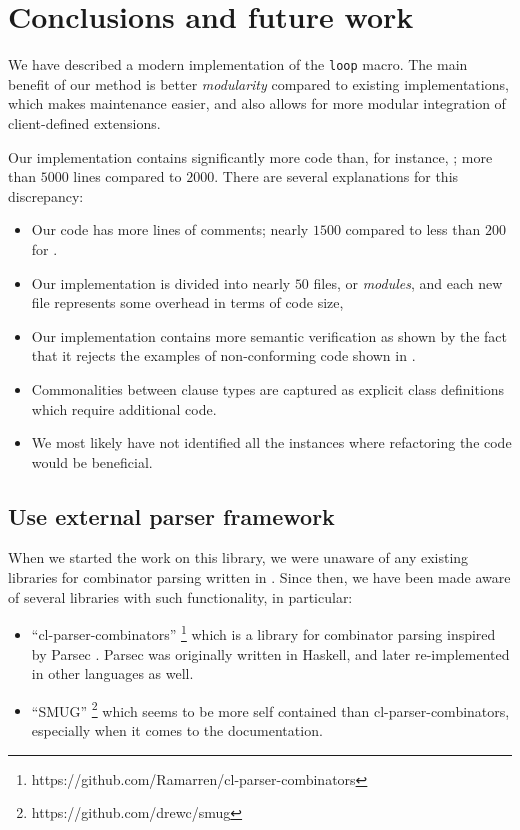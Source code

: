 \section{Conclusions and future work}

We have described a modern implementation of the \commonlisp{}
\texttt{loop} macro.  The main benefit of our method is better
\emph{modularity} compared to existing implementations, which makes
maintenance easier, and also allows for more modular integration of
client-defined extensions.

Our implementation contains significantly more code than, for
instance, \mitloop{}; more than $5000$ lines compared to $2000$.  There
are several explanations for this discrepancy:

\begin{itemize}
\item Our code has more lines of comments; nearly $1500$ compared to
  less than $200$ for \mitloop{}.
\item Our implementation is divided into nearly $50$ files, or
  \emph{modules}, and each new file represents some overhead in terms
  of code size,
\item Our implementation contains more semantic verification as shown
  by the fact that it rejects the examples of non-conforming code shown
  in .
\item Commonalities between clause types are captured as explicit
  class definitions which require additional code.
\item We most likely have not identified all the instances where
  refactoring the code would be beneficial.
\end{itemize}

\subsection{Use external parser framework}
\label{sec-using-external-parser-framework}

When we started the work on this library, we were unaware of any
existing libraries for combinator parsing written in \commonlisp{}.
Since then, we have been made aware of several libraries with such
functionality, in particular:

\begin{itemize}
\item ``cl-parser-combinators''%
\footnote{https://github.com/Ramarren/cl-parser-combinators} which is
a library for combinator parsing inspired by Parsec
\cite{Leijen:Meijer:Parsec}.  Parsec was originally written in
Haskell, and later re-implemented in other languages as well.
\item ``SMUG''%
\footnote{https://github.com/drewc/smug} which seems to be more
self contained than cl-parser-combinators, especially when it
comes to the documentation.
\end{itemize}

